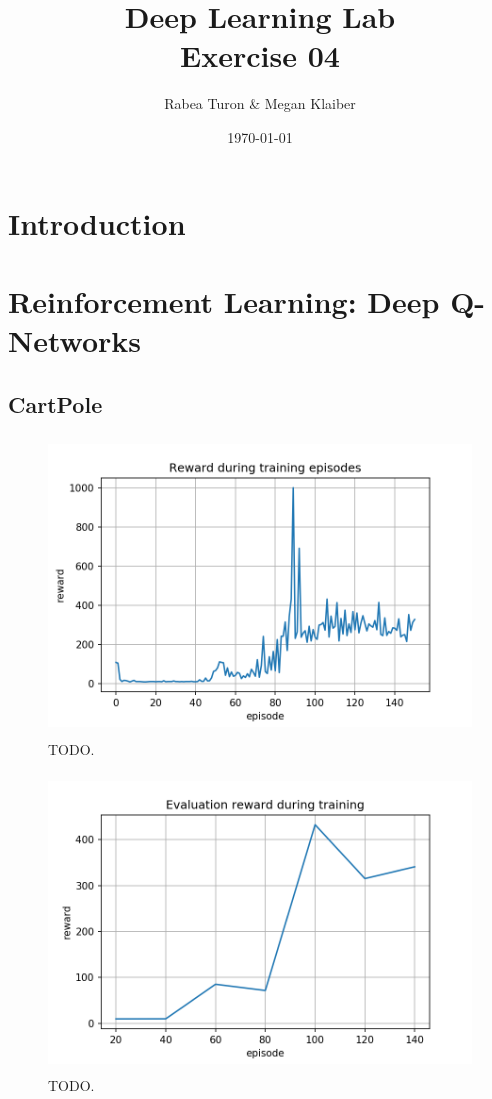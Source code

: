 \documentclass[a4paper,12pt]{article}
\begin{document}
\title{Deep Learning Lab \\ Exercise 04 }
\author{Rabea Turon \& Megan Klaiber}
\date{\today}
\maketitle

\section{Introduction}


\section{Reinforcement Learning: Deep Q-Networks}\label{rl}


\subsection{CartPole}\label{cartpole}

\begin{figure}[H]
	\centering \includegraphics[width=11.70cm, height=7.9cm]{plots/cartpole_episode_reward.png}
	\caption{
		\label{fig:cartpole_episode_reward}
		TODO.
	}
\end{figure}

\begin{figure}[H]
	\centering \includegraphics[width=11.70cm, height=7.9cm]{plots/cartpole_evaluation_reward.png}
	\caption{
		\label{fig:cartpole_evaluation_reward}
		TODO.
	}
\end{figure}
\end{document}

